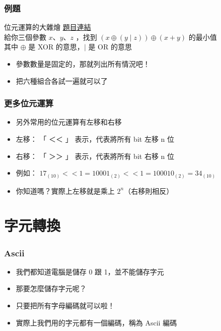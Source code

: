\documentclass[mathserif]{beamer}
\begin{document}
\begin{frame}
    \frametitle{例題}
    \begin{block}{位元運算的大雜燴}
        \href{https://codeforces.com/group/S6XjkGb6qB/contest/403070/problem/B}{題目連結}\\
        給你三個參數 $x$、$y$、$z$ ，找到 $(x \oplus (y \mid z)) \oplus (x+y)$ 的最小值\\
        其中 $\oplus$ 是 XOR 的意思，$\mid$ 是 OR 的意思
    \end{block}
    \begin{itemize}
        \item<2-> 參數數量是固定的，那就列出所有情況吧！
        \item<2-> 把六種組合各試一遍就可以了
    \end{itemize}
\end{frame}

\begin{frame}
    \frametitle{更多位元運算}
    \begin{itemize}
        \item 另外常用的位元運算有左移和右移
        \vspace{0.5cm}
        \item<2-> 左移： 「 ＜＜ 」 表示，代表將所有 bit 左移 n 位
        \item<2-> 右移： 「 ＞＞ 」 表示，代表將所有 bit 右移 n 位
        \vspace{0.5cm}
        \item<3-> 例如： $17_{(10)} << 1 = 10001_{(2)} << 1 = 100010_{(2)} = 34_{(10)}$
        \item<3->你知道嗎？實際上左移就是乘上 $2^n$（右移則相反）
    \end{itemize}
\end{frame}

\section{字元轉換}

\begin{frame}
    \frametitle{Ascii}
    \begin{itemize}
        \item 我們都知道電腦是儲存 0 跟 1，並不能儲存字元
        \item 那要怎麼儲存字元呢？
        \item<2-> 只要把所有字母編碼就可以啦！
        \item<2-> 實際上我們用的字元都有一個編碼，稱為 Ascii 編碼
    \end{itemize}
\end{frame}
\end{document}
